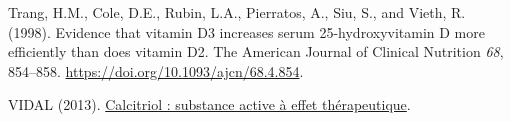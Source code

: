 \documentclass[
  a4paper,
  DIV=11,
  numbers=noendperiod,
  listof=totoc]{scrreprt}
\newlength{\cslhangindent}
\newlength{\cslentryspacingunit} %
\newenvironment{CSLReferences}[2] %
 {%
  \setlength{\parindent}{0pt}
  \ifodd #1
  \let\oldpar\par
  \def\par{\hangindent=\cslhangindent\oldpar}
  \fi
  \setlength{\parskip}{#2\cslentryspacingunit}
 }%
 {}
\begin{document}
\begin{CSLReferences}{0}{0}
\leavevmode{}%
Trang, H.M., Cole, D.E., Rubin, L.A., Pierratos, A., Siu, S., and Vieth,
R. (1998). {Evidence that vitamin D3 increases serum 25-hydroxyvitamin D
more efficiently than does vitamin D2}. The American Journal of Clinical
Nutrition \emph{68}, 854--858.
\url{https://doi.org/10.1093/ajcn/68.4.854}.

\leavevmode{}%
VIDAL (2013).
\href{https://www.vidal.fr/medicaments/substances/calcitriol-4158.html}{{Calcitriol
: substance active à effet thérapeutique}}.

\end{CSLReferences}
\end{document}

